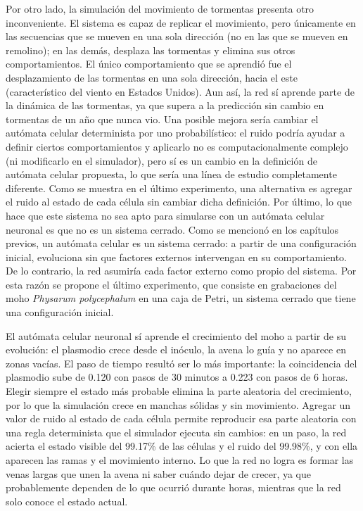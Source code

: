 Por otro lado, la simulación del movimiento de tormentas presenta otro inconveniente. El sistema es capaz de replicar el movimiento, pero únicamente en las secuencias que se mueven en una sola dirección (no en las que se mueven en remolino); en las demás, desplaza las tormentas y elimina sus otros comportamientos. El único comportamiento que se aprendió fue el desplazamiento de las tormentas en una sola dirección, hacia el este (característico del viento en Estados Unidos). Aun así, la red sí aprende parte de la dinámica de las tormentas, ya que supera a la predicción sin cambio en tormentas de un año que nunca vio. Una posible mejora sería cambiar el autómata celular determinista por uno probabilístico: el ruido podría ayudar a definir ciertos comportamientos y aplicarlo no es computacionalmente complejo (ni modificarlo en el simulador), pero sí es un cambio en la definición de autómata celular propuesta, lo que sería una línea de estudio completamente diferente. Como se muestra en el último experimento, una alternativa es agregar el ruido al estado de cada célula sin cambiar dicha definición. Por último, lo que hace que este sistema no sea apto para simularse con un autómata celular neuronal es que no es un sistema cerrado. Como se mencionó en los capítulos previos, un autómata celular es un sistema cerrado: a partir de una configuración inicial, evoluciona sin que factores externos intervengan en su comportamiento. De lo contrario, la red asumiría cada factor externo como propio del sistema. Por esta razón se propone el último experimento, que consiste en grabaciones del moho \textit{Physarum polycephalum} en una caja de Petri, un sistema cerrado que tiene una configuración inicial.

El autómata celular neuronal sí aprende el crecimiento del moho a partir de su evolución: el plasmodio crece desde el inóculo, la avena lo guía y no aparece en zonas vacías. El paso de tiempo resultó ser lo más importante: la coincidencia del plasmodio sube de 0.120 con pasos de 30 minutos a 0.223 con pasos de 6 horas. Elegir siempre el estado más probable elimina la parte aleatoria del crecimiento, por lo que la simulación crece en manchas sólidas y sin movimiento. Agregar un valor de ruido al estado de cada célula permite reproducir esa parte aleatoria con una regla determinista que el simulador ejecuta sin cambios: en un paso, la red acierta el estado visible del 99.17\% de las células y el ruido del 99.98\%, y con ella aparecen las ramas y el movimiento interno. Lo que la red no logra es formar las venas largas que unen la avena ni saber cuándo dejar de crecer, ya que probablemente dependen de lo que ocurrió durante horas, mientras que la red solo conoce el estado actual.

